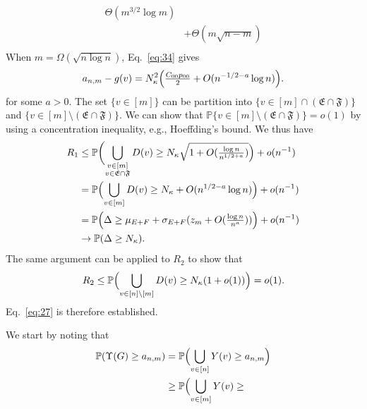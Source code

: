 \documentclass[10pt,journal,compsoc]{IEEEtran}
\theoremstyle{definition}
\begin{document}
\begin{IEEEproof}[Lemma~8]
\begin{IEEEproof}[Eq.~\eqref{eq:27}]
\begin{equation}
\begin{split}
  \Theta(m^{3/2} \log{m}) \\ &+ 
  \Theta(m \sqrt{n - m}) \\
  \end{split}
\end{equation}
When $m = \Omega(\sqrt{n \log n})$, Eq.~\eqref{eq:34} gives
\begin{equation}
  \label{eq:35}
  a_{n,m} - g(v) = N_{\kappa}^{2}\Bigl(\tfrac{C_{00}p_{00}}{2} + O(n^{-1/2 - a}
  \log{n})\Bigr).
\end{equation}
for some $a > 0$. The set $\{v \in [m]\}$ can be partition into
$\{v \in [m] \cap (\mathfrak{E} \cap\mathfrak{F})\}$ and $\{v \in [m]
\setminus (\mathfrak{E} \cap \mathfrak{F})\}$. We can show that
$\mathbb{P}\{v \in [m] \setminus (\mathfrak{E} \cap \mathfrak{F})\} =
o(1)$ by using a concentration inequality, e.g., Hoeffding's
bound. We thus have
\begin{equation}
  \label{eq:37}
  \begin{split}
    R_1 &\leq \mathbb{P}\biggl( \bigcup_{\substack{v \in [m] \\ v
        \in \mathfrak{E} \cap \mathfrak{F}}} D(v) \geq
    N_{\kappa} \sqrt{1 + O(\tfrac{\log{n}}{n^{1/2+a}})} \Bigr) + o(n^{-1}) \\
    & = \mathbb{P}\Bigl(\bigcup_{v \in [m]} D(v) \geq N_\kappa +
    O(n^{1/2 - a} \log{n})\Bigr) + o(n^{-1}) \\
    &= \mathbb{P}\Bigl(\Delta \geq \mu_{E+F} +
    \sigma_{E+F}(z_m + O(\tfrac{\log{n}}{n^{a}}))\Bigr) + o(n^{-1}) \\ 
    & \rightarrow \mathbb{P}(\Delta \geq N_{\kappa}).
    \end{split}
\end{equation}
The same argument can be applied to $R_2$ to show that
\begin{equation}
  \label{eq:38}
  R_2 \leq \mathbb{P}\Bigl(\bigcup_{v \in [n] \setminus [m]} D(v) \geq
  N_{\kappa}(1 + o(1))\Bigr) = o(1).
\end{equation}
Eq.~\eqref{eq:27} is therefore established.
\end{IEEEproof}
\begin{IEEEproof}[Eq.~\eqref{eq:30}]
  We start by noting that
  \begin{equation*}
    \begin{split}
      \mathbb{P}(\Upsilon(G) \geq a_{n,m}) &=
      \mathbb{P}\Bigl(\bigcup_{v \in [n]}Y(v) \geq
      a_{n,m}\Bigr) \\
      & \geq \mathbb{P}\Bigl(\bigcup_{v \in [m]}Y(v) \geq

\end{split}
\end{equation*}
\end{IEEEproof}
\end{IEEEproof}
\end{document}
